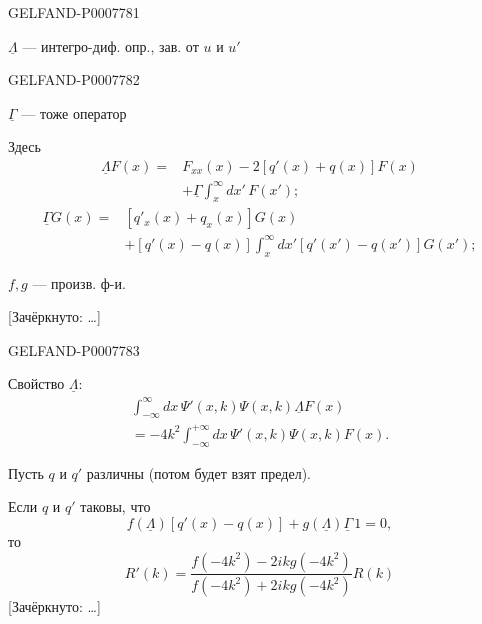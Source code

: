 \begin{GelfandAdjacentEvidence}{GELFAND-P000778}{1}

\(\underline\Lambda\) --- интегро-диф. опр., зав. от \(u\) и \(u'\)
\end{GelfandAdjacentEvidence}
\begin{GelfandAdjacentEvidence}{GELFAND-P000778}{2}


\(\underline\Gamma\) --- тоже оператор

Здесь
\begin{equation}
\begin{split}
\underline\Lambda F(x)={}&F_{xx}(x)-2[q'(x)+q(x)]F(x)\\
&+\underline\Gamma\int_x^\infty dx'\,F(x');
\end{split}\tag{7}
\end{equation}
\begin{equation}
\begin{split}
\underline\Gamma G(x)={}&[q'_x(x)+q_x(x)]G(x)\\
&+[q'(x)-q(x)]\int_x^\infty dx'[q'(x')-q(x')]G(x');
\end{split}\tag{8}
\end{equation}

\(f,g\) --- произв. ф-и.

[Зачёркнуто: …]
\end{GelfandAdjacentEvidence}
\begin{GelfandAdjacentEvidence}{GELFAND-P000778}{3}

Свойство \(\underline\Lambda\):
\begin{multline}
\int_{-\infty}^\infty dx\,\Psi'(x,k)\Psi(x,k)\underline\Lambda F(x)\\
=-4k^2\int_{-\infty}^{+\infty}dx\,\Psi'(x,k)\Psi(x,k)F(x).\tag{9}
\end{multline}

Пусть \(q\) и \(q'\) различны (потом будет взят предел).

Если \(q\) и \(q'\) таковы, что
\begin{equation}
f(\underline\Lambda)[q'(x)-q(x)]+g(\underline\Lambda)\underline\Gamma\,1=0,\tag{10}
\end{equation}
то
\begin{equation}
R'(k)=\frac{f(-4k^2)-2ikg(-4k^2)}{f(-4k^2)+2ikg(-4k^2)}R(k)\tag{11}
\end{equation}
[Зачёркнуто: …]
\end{GelfandAdjacentEvidence}
